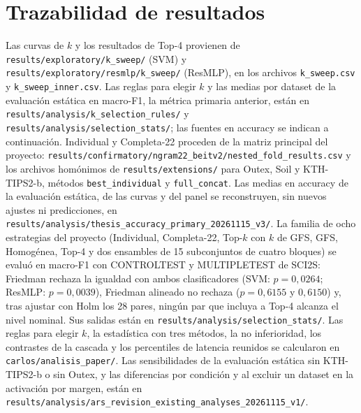 \documentclass[a4paper,fleqn]{cas-sc}
\begin{document}
\clearpage
\appendix
\section{Trazabilidad de resultados}\label{app:reproducibilidad}

Las curvas de $k$ y los resultados de Top-4 provienen de \nolinkurl{results/exploratory/k_sweep/} (SVM) y \nolinkurl{results/exploratory/resmlp/k_sweep/} (ResMLP), en los archivos \nolinkurl{k_sweep.csv} y \nolinkurl{k_sweep_inner.csv}. Las reglas para elegir $k$ y las medias por dataset de la evaluación estática en macro-F1, la métrica primaria anterior, están en \nolinkurl{results/analysis/k_selection_rules/} y \nolinkurl{results/analysis/selection_stats/}; las fuentes en accuracy se indican a continuación. Individual y Completa-22 proceden de la matriz principal del proyecto: \nolinkurl{results/confirmatory/ngram22_beitv2/nested_fold_results.csv} y los archivos homónimos de \nolinkurl{results/extensions/} para Outex, Soil y KTH-TIPS2-b, métodos \texttt{best\_individual} y \texttt{full\_concat}. Las medias en accuracy de la evaluación estática, de las curvas y del panel se reconstruyen, sin nuevos ajustes ni predicciones, en \nolinkurl{results/analysis/thesis_accuracy_primary_20261115_v3/}. La familia de ocho estrategias del proyecto (Individual, Completa-22, Top-$k$ con $k$ de GFS, GFS, Homogénea, Top-4 y dos ensambles de 15 subconjuntos de cuatro bloques) se evaluó en macro-F1 con CONTROLTEST y MULTIPLETEST de SCI2S: Friedman rechaza la igualdad con ambos clasificadores (SVM: $p=0{,}0264$; ResMLP: $p=0{,}0039$), Friedman alineado no rechaza ($p=0{,}6155$ y $0{,}6150$) y, tras ajustar con Holm los 28 pares, ningún par que incluya a Top-4 alcanza el nivel nominal. Sus salidas están en \nolinkurl{results/analysis/selection_stats/}. Las reglas para elegir $k$, la estadística con tres métodos, la no inferioridad, los contrastes de la cascada y los percentiles de latencia reunidos se calcularon en \nolinkurl{carlos/analisis_paper/}. Las sensibilidades de la evaluación estática sin KTH-TIPS2-b o sin Outex, y las diferencias por condición y al excluir un dataset en la activación por margen, están en \nolinkurl{results/analysis/ars_revision_existing_analyses_20261115_v1/}.
\end{document}
